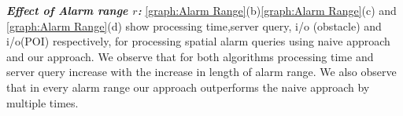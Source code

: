 \textbf{\emph{Effect of Alarm range $r$: }}
\ref{graph:Alarm Range}(b)\ref{graph:Alarm Range}(c) and \ref{graph:Alarm Range}(d) show processing time,server query, i/o (obstacle) and i/o(POI) respectively, for processing spatial alarm queries using naive approach and our approach. We observe that for both algorithms processing time and server query increase with the increase in length of alarm range. We also observe that in every alarm range our approach outperforms the naive approach by multiple times.



\vspace*{10pt}

